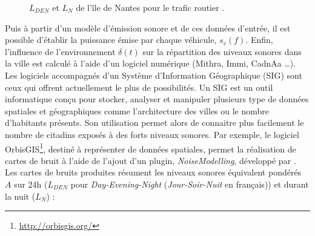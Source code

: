 \begin{figure}[t]
\centering
{}
\caption{$L_{DEN}$  et $L_N$  de l'île de Nantes pour le trafic routier \cite{nantes_carte}.}
\label{fig:carto_nantes}
\end{figure}

Puis à partir d'un modèle d'émission sonore et de ces données d'entrée, il est possible d'établir la puissance émise par chaque véhicule, $s_{v}(f)$.
Enfin, l'influence de l'environnement $\delta(t)$ sur la répartition des niveaux sonores dans la ville est calculé à l'aide d'un logiciel numérique (Mithra, Immi, CadnAa \dots). Les logiciels accompagnés d'un Système d'Information Géographique (SIG) sont ceux qui offrent actuellement le plus de possibilités. Un SIG est un outil informatique conçu pour stocker, analyser et manipuler plusieurs type de données spatiales et géographiques comme l'architecture des villes ou le nombre d'habitants présents.
Son utilisation permet alors de connaitre plus facilement le nombre de citadins exposés à des forts niveaux sonores.
Par exemple, le logiciel OrbisGIS\footnote{\url{http://orbisgis.org/}}, destiné à représenter de données spatiales, permet la réalisation de cartes de bruit à l'aide de l'ajout d'un plugin, \textit{NoiseModelling}, développé par \cite{fortin}. \\

Les cartes de bruits produites résument les niveaux sonores équivalent pondérés $A$ sur 24h ($L_{DEN}$ pour \textit{Day-Evening-Night} (\textit{Jour-Soir-Nuit} en français)) et durant la nuit ($L_N$) :

